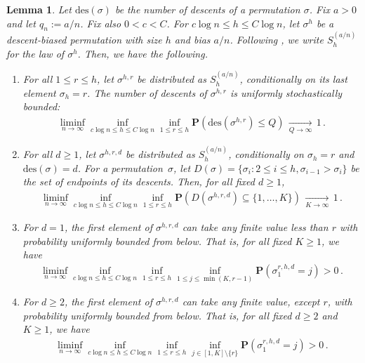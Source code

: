 \documentclass{article}
\newtheorem{lemma}[theorem]{Lemma}
\theoremstyle{remark}
\newcommand{\cv}[1]{\,\underset{#1}{\longrightarrow}\,}
\newcommand{\prob}[1]{\mathbf{P}{\left(#1\right)}}
\newcommand{\des}[1]{{\mathrm{des}{\left(#1\right)}}}
\begin{document}
\begin{lemma}
\label{lem:structure_of_permutations}
Let $\des{\sigma}$ be the number of descents of a permutation $\sigma$.
Fix $a > 0$ and let $q_n := a/n$.
Fix also $0<c<C$. 
For $c\log n\le h\le C\log n$, let $\sigma^{h}$ be a descent-biased permutation with size $h$ and bias $a/n$.
Following \cite{Thevenin_Wagner_2023}, we write $S^{(a/n)}_{h}$ for the law of $\sigma^h$.
Then, we have the following.
\begin{enumerate}[label=(\roman*)]
    \item For all $1\le r\le h$, let $\sigma^{h,r}$ be distributed as $S^{(a/n)}_{h}$, conditionally on its last element $\sigma_h=r$.
    The number of descents of $\sigma^{h,r}$ is uniformly stochastically bounded: 
    \begin{align*}
    \liminf_{n\to\infty} \inf_{c\log n\le h\le C\log n} \inf_{1\le r\le h}
    \prob{\des{\sigma^{h,r}} \le Q} \cv{Q\to\infty} 1 \,.
    \end{align*}
    \item For all $d\ge 1$, let $\sigma^{h,r,d}$ be distributed as $S^{(a/n)}_{h}$, conditionally on $\sigma_h=r$ and $\des{\sigma}=d$. 
    For a permutation~$\sigma$, let $D(\sigma)=\{\sigma_i : 2\le i\le h, \sigma_{i-1} > \sigma_i\}$ be the set of endpoints of its descents.
    Then, for all fixed $d\ge1$,
    \begin{align*}
    \liminf_{n\to\infty} \inf_{c\log n\le h\le C\log n} \inf_{1\le r\le h}
    \prob{D(\sigma^{h,r,d}) \subseteq \{1,\ldots,K\} } \cv{K\to\infty} 1 \,.
    \end{align*}
    \item For $d=1$, the first element of $\sigma^{h,r,d}$ can take any finite value less than $r$ with probability uniformly bounded from below.
    That is, for all fixed $K\ge1$, we have
    \begin{align*}
    \liminf_{n\to\infty} \inf_{c\log n\le h\le C\log n} \inf_{1\le r\le h} \inf_{1\le j\le \min(K,r-1)}
    \prob{\sigma_1^{r,h,d} = j} > 0 \,.
    \end{align*}
    \item For $d\ge2$, the first element of $\sigma^{h,r,d}$ can take any finite value, except $r$, with probability uniformly bounded from below.
    That is, for all fixed $d\ge2$ and $K\ge1$, we have
    \begin{align*}
    \liminf_{n\to\infty} \inf_{c\log n\le h\le C\log n} \inf_{1\le r\le h} \inf_{j\in [1,K] \setminus \{r\}}
    \prob{\sigma_1^{r,h,d} = j} > 0 \,.
    \end{align*}
\end{enumerate}
\end{lemma}
\end{document}
